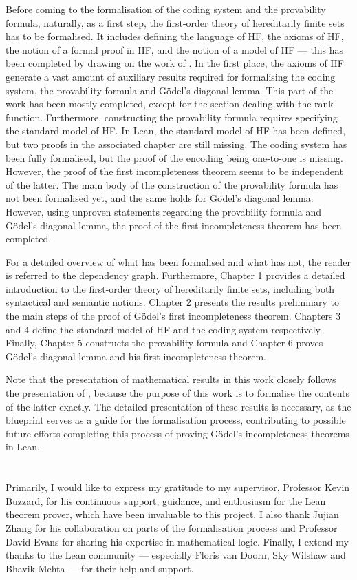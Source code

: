 Before coming to the formalisation of the coding system and the provability formula, naturally,
as a first step, the first-order theory of hereditarily finite sets has to be formalised.
It includes defining the language of HF, the axioms of HF, the notion of a formal proof in HF,
and the notion of a model of HF — this has been completed by drawing on the work of
\cite{han2020formal}.
In the first place, the axioms of HF generate a vast amount of auxiliary results required for 
formalising the coding system, the provability formula and Gödel's diagonal lemma. 
This part of the work has been mostly completed, 
except for the section dealing with the rank function.
Furthermore, constructing the provability formula requires specifying the standard model of HF.
In Lean, the standard model of HF has been defined, but two proofs in the associated chapter
are still missing.
The coding system has been fully formalised, but the proof of the encoding being one-to-one
is missing. However, the proof of the first incompleteness theorem seems to be independent of the
latter.
The main body of the construction of the provability formula has not been formalised yet,
and the same holds for Gödel's diagonal lemma.
However, using unproven statements regarding the provability formula and Gödel's diagonal lemma, 
the proof of the first incompleteness theorem has been completed. 

For a detailed overview of what has been formalised and what has not, 
the reader is referred to the dependency graph.
Furthermore, 
Chapter 1 provides a detailed introduction to the first-order theory of hereditarily finite sets,
including both syntactical and semantic notions.
Chapter 2 presents the results preliminary to the main steps of the proof of Gödel's first
incompleteness theorem.
Chapters 3 and 4 define the standard model of HF and the coding system respectively.
Finally, Chapter 5 constructs the provability formula and Chapter 6
proves Gödel's diagonal lemma and his first incompleteness theorem.

Note that the presentation of mathematical results in this work closely follows the presentation of  
\cite{swierczkowski2003finite}, because the purpose of this work is to formalise 
the contents of the latter exactly.
The detailed presentation of these results is necessary, 
as the blueprint serves as a guide for the formalisation process, 
contributing to possible future efforts completing this process of proving
Gödel's incompleteness theorems in Lean.\\\\

\\

\noindent Primarily, I would like to express my gratitude to my supervisor, Professor Kevin Buzzard, 
for his continuous support, guidance, and enthusiasm for the Lean theorem prover, 
which have been invaluable to this project.
I also thank Jujian Zhang for his collaboration on parts of the formalisation process and 
Professor David Evans for sharing his expertise in mathematical logic. 
Finally, I extend my thanks to the Lean community — especially Floris van Doorn, Sky Wilshaw and 
Bhavik Mehta — for their help and support.


